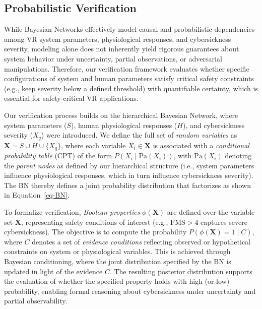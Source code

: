 \documentclass{vgtc}                          %
\begin{document}


\subsection{Probabilistic Verification}\label{sec:prob_veri}
While Bayesian Networks effectively model causal and probabilistic dependencies among VR system parameters, physiological responses, and cybersickness severity, modeling alone does not inherently yield rigorous guarantees about system behavior under uncertainty, partial observations, or adversarial manipulations. Therefore, our verification framework evaluates whether specific configurations of system and human parameters satisfy critical safety constraints (e.g.,  keep severity below a defined threshold) with quantifiable certainty, which is essential for safety-critical VR applications.

Our verification process builds on the hierarchical Bayesian Network, where system parameters ($S$), human physiological responses ($H$), and cybersickness severity ($X_q$) were introduced. We define the full set of {\em random variables} as \(\mathbf{X} = S \cup H \cup \{X_q\}\), where each variable \(X_i \in \mathbf{X}\) is associated with a {\em conditional probability table} (CPT) of the form \(P(X_i \mid \mathrm{Pa}(X_i))\), with \(\mathrm{Pa}(X_i)\) denoting the {\em parent nodes} as defined by our hierarchical structure (i.e., system parameters influence physiological responses, which in turn influence cybersickness severity). The BN thereby defines a joint probability distribution that factorizes as shown in Equation~\ref{eq-BN}.


To formalize verification, {\em Boolean properties} \(\phi(\mathbf{X})\) are defined over the variable set \(\mathbf{X}\), representing safety conditions of interest (e.g., \(\mathrm{FMS} > 4\) captures severe cybersickness). The objective is to compute the probability \(P(\phi(\mathbf{X}) = 1 \mid C)\), where \(C\) denotes a set of {\em evidence conditions} reflecting observed or hypothetical constraints on system or physiological variables. This is achieved through Bayesian conditioning, where the joint distribution specified by the BN is updated in light of the evidence \(C\). The resulting posterior distribution supports the evaluation of whether the specified property holds with high (or low) probability, enabling formal reasoning about cybersickness under uncertainty and partial observability.
\end{document}
